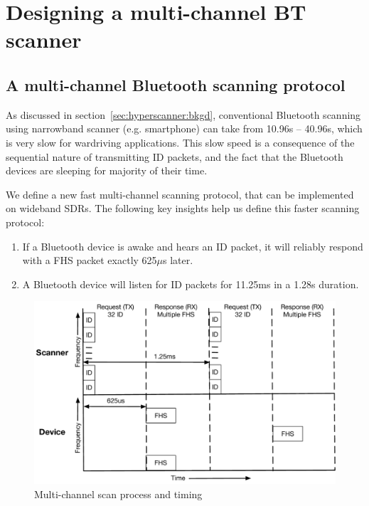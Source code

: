 \section{Designing a multi-channel BT scanner}
\label{sec:hyperscanner:design}

\subsection{A multi-channel Bluetooth scanning protocol}
As discussed in section~\ref{sec:hyperscanner:bkgd}, conventional Bluetooth scanning using narrowband scanner (e.g. smartphone) can take from 10.96s -- 40.96s, which is very slow for wardriving applications.
%
This slow speed is a consequence of the sequential nature of transmitting ID packets, and the fact that the Bluetooth devices are sleeping for majority of their time.
%

We define a new fast multi-channel scanning protocol, that can be implemented on  wideband SDRs.
%
The following key insights help us define this faster scanning protocol:
\begin{enumerate}
    \item If a Bluetooth device is awake and hears an ID packet, it will reliably respond with a FHS packet exactly 625$\mu$s later.
    \item A Bluetooth device will listen for ID packets for 11.25ms in a 1.28s duration.
\end{enumerate}
\begin{figure}
    \centering
    \captionsetup{justification=centering}
    \includegraphics[width=\textwidth]{hyperscanner/figs/bt_multi_chain.pdf}
    \caption{Multi-channel scan process and timing}
    \label{fig:hyperscanner:bt_multi_chan}
\end{figure}

